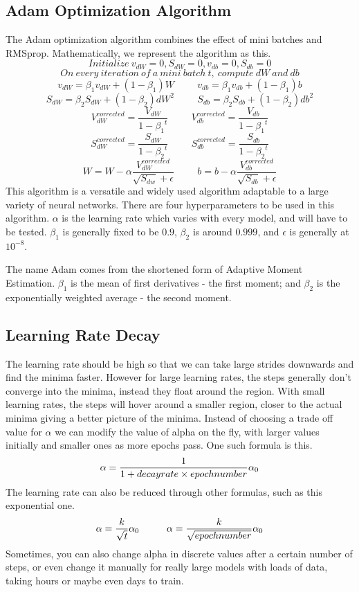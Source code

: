 \documentclass{article}
\begin{document}
\subsection{Adam Optimization Algorithm}

The Adam optimization algorithm combines the effect of mini batches and RMSprop. Mathematically, we represent the algorithm as this.
$$ Initialize\ v_{dW} = 0, S_{dW} = 0, v_{db} = 0, S_{db} = 0$$
$$ On\ every\ iteration\ of\ a\ mini\ batch\ t,\ compute\ dW\ and\ db$$
$$v_{d W} = \beta_1 v_{d W} + (1-\beta_1)W \hspace{1cm} v_{d b} = \beta_1 v_{d b} + (1-\beta_1)b$$
$$S_{d W} = \beta_2 S_{d W} + (1-\beta_2) {d W}^2 \hspace{1cm} S_{d b} = \beta_2 S_{d b} + (1-\beta_2) {d b}^2$$
$$V_{dW}^{corrected} = \frac{V_{dW}}{1-{\beta_1}^t} \hspace{1cm} V_{db}^{corrected} = \frac{V_{db}}{1-{\beta_1}^t}$$
$$S_{dW}^{corrected} = \frac{S_{dW}}{1-{\beta_2}^t} \hspace{1cm} S_{db}^{corrected} = \frac{S_{db}}{1-{\beta_2}^t}$$
$$W = W - \alpha \frac{V_{dW}^{corrected}}{\sqrt{S_{dw}}+\epsilon} \hspace{1cm} b = b - \alpha \frac{V_{db}^{corrected}}{\sqrt{S_{db}}+\epsilon}$$
This algorithm is a versatile and widely used algorithm adaptable to a large variety of neural networks. There are four hyperparameters to be used in this algorithm. $\alpha$ is the learning rate which varies with every model, and will have to be tested. $\beta_1$ is generally fixed to be $0.9$, $\beta_2$ is around $0.999$, and $\epsilon$ is generally at $10^{-8}$. 

The name Adam comes from the shortened form of Adaptive Moment Estimation. $\beta_1$ is the mean of first derivatives - the first moment; and $\beta_2$ is the exponentially weighted average - the second moment. 

\subsection{Learning Rate Decay}

The learning rate should be high so that we can take large strides downwards and find the minima faster. However for large learning rates, the steps generally don't converge into the minima, instead they float around the region. With small learning rates, the steps will hover around a smaller region, closer to the actual minima giving a better picture of the minima. Instead of choosing a trade off value for $\alpha$ we can modify the value of alpha on the fly, with larger values initially and smaller ones as more epochs pass. One such formula is this.
$$\alpha = \frac{1}{1+decay \- rate \times epoch \- number}\alpha_0$$
The learning rate can also be reduced through other formulas, such as this exponential one.
$$\alpha = \frac{k}{\sqrt{t}} \alpha_0 \hspace{1cm} \alpha = \frac{k}{\sqrt{epoch \- number}} \alpha_0$$ 
Sometimes, you can also change alpha in discrete values after a certain number of steps, or even change it manually for really large models with loads of data, taking hours or maybe even days to train.
\end{document}
